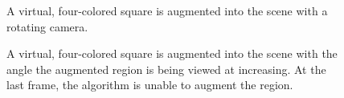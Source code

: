 \documentclass[oneside,11pt]{Latex/Classes/PhDthesisPSnPDF}
\begin{document}
\begin{figure}[h!]
  \caption{\label{fig_rotational_augmentation} A virtual, four-colored square is augmented into the scene with a rotating camera.}
\end{figure}

\begin{figure}[h!]
  \caption{\label{fig_angle_augmentation} A virtual, four-colored square is augmented into the scene with the angle the augmented region is being viewed at increasing. At the last frame, the algorithm is unable to augment the region.}
\end{figure}
\end{document}
